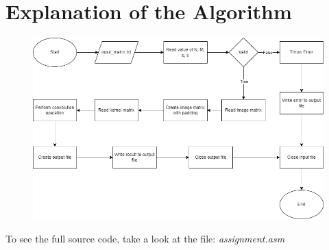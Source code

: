 \documentclass[a4paper]{article}
\begin{document}
\section{Explanation of the Algorithm}
\begin{figure}[!h]
\centering
\includegraphics[scale=0.5]{Images/flowchart.png}
\end{figure}
To see the full source code, take a look at the file: \textit{assignment.asm}\\ \\
\end{document}
